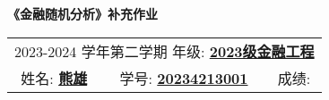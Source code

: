 \documentclass[12pt]{article}
\begin{document}
\vspace{1em}
\begin{center}
\textbf{\LARGE 《金融随机分析》补充作业}\par
\vspace{6pt}
\end{center}
\thispagestyle{firstpage}
\renewcommand{\arraystretch}{1.4} %
\begin{center}
  \large
  \begin{tabular}{c c c}
    \multicolumn{3}{c}{2023-2024 学年第二学期 \hspace{3em} 年级: \underline{\hspace{0.5cm}\textbf{2023级金融工程}\hspace{0.5cm}}} \\
    姓名: \underline{\hspace{1cm}\textbf{熊雄}\hspace{1cm}} & 学号: \underline{\hspace{0.3cm}\textbf{20234213001}\hspace{0.3cm}} & 成绩: \underline{\hspace{3.2cm}} \\
\end{tabular}
\end{center}
\end{document}
